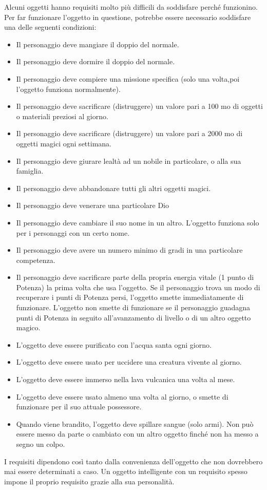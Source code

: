 \documentclass[a4paper,11pt,twoside,openany]{book}
\begin{document}
{Alcuni oggetti hanno requisiti molto più difficili da soddisfare perché funzionino. Per far funzionare l'oggetto in questione, potrebbe essere necessario soddisfare una delle seguenti condizioni:
\begin{itemize}
\item Il personaggio deve mangiare il doppio del normale. 
\item Il personaggio deve dormire il doppio del normale. 
\item Il personaggio deve compiere una missione specifica (solo una volta,poi l'oggetto funziona normalmente). 
\item Il personaggio deve sacrificare (distruggere) un valore pari a 100 mo di oggetti o materiali preziosi al giorno. 
\item Il personaggio deve sacrificare (distruggere) un valore pari a 2000 mo di oggetti magici ogni settimana. 
\item Il personaggio deve giurare lealtà ad un nobile in particolare, o alla sua famiglia. 
\item Il personaggio deve abbandonare tutti gli altri oggetti magici. 
\item Il personaggio deve venerare una particolare Dio 
\item Il personaggio deve cambiare il suo nome in un altro. L'oggetto funziona solo per i personaggi con un certo nome. 
\item Il personaggio deve avere un numero minimo di gradi in una particolare competenza. 
\item Il personaggio deve sacrificare parte della propria energia vitale (1 punto di Potenza) la prima volta che usa l'oggetto. Se il personaggio trova un modo di recuperare i punti di Potenza persi, l'oggetto smette immediatamente di funzionare. L'oggetto non smette di funzionare se il personaggio guadagna punti di Potenza in seguito all'avanzamento
di livello o di un altro oggetto magico. 
\item L'oggetto deve essere purificato con l'acqua santa ogni giorno. 
\item L'oggetto deve essere usato per uccidere una creatura vivente al giorno. 
\item L'oggetto deve essere immerso nella lava vulcanica una volta al mese. 
\item L'oggetto deve essere usato almeno una volta al giorno, o smette di funzionare per il suo attuale possessore. 
\item Quando viene brandito, l'oggetto deve spillare sangue (solo armi). Non può essere messo da parte o cambiato con un altro oggetto finché non ha messo a segno un colpo. 
\end{itemize}
I requisiti dipendono così tanto dalla convenienza dell'oggetto che non dovrebbero mai essere determinati a caso. Un oggetto intelligente con un requisito spesso impone il proprio requisito grazie alla sua personalità. 

}
\end{document}
